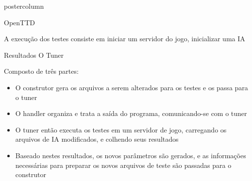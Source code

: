 \documentclass[final]{beamer}
\begin{document}
\begin{frame}
\begin{columns}
\begin{column}{.5\textwidth}
\begin{beamercolorbox}[center,wd=\textwidth]{postercolumn}
\begin{minipage}[T]{.95\textwidth}
{\begin{block}{OpenTTD}
                \vspace*{0,5cm}
                
                A execução dos testes consiste em iniciar um servidor do jogo, inicializar uma IA
                
                \vspace*{0.2cm} 
            \end{block}

            \vspace*{0.2cm} 
            
            \begin{block}{Resultados}
              \justifying 
                O Tuner
                
                \vspace*{0.2cm} 
                
                Composto de três partes:
                \begin{itemize}
                	\item O construtor gera os arquivos a serem alterados para os testes e os passa para o tuner
                	\item O handler organiza e trata a saída do programa, comunicando-se com o tuner
                	\item O tuner então executa os testes em um servidor de jogo, carregando os arquivos de IA modificados, e colhendo seus resultados
                	\item Baseado nestes resultados, os novos parâmetros são gerados, e as informações necessárias para preparar os novos arquivos de teste são passadas para o construtor
                \end{itemize}
                
                
                \vspace*{0.4cm}
                

\end{block}}
\end{minipage}
\end{beamercolorbox}
\end{column}
\end{columns}
\end{frame}
\end{document}
